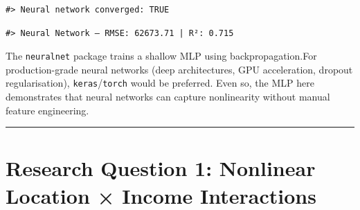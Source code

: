 \documentclass[
]{article}
\newenvironment{Shaded}{\begin{snugshade}}{\end{snugshade}}
\newcommand{\DecValTok}[1]{\textcolor[rgb]{0.00,0.00,0.81}{#1}}
\newcommand{\FunctionTok}[1]{\textcolor[rgb]{0.13,0.29,0.53}{\textbf{#1}}}
\newcommand{\NormalTok}[1]{#1}
\newcommand{\OtherTok}[1]{\textcolor[rgb]{0.56,0.35,0.01}{#1}}
\newcommand{\SpecialCharTok}[1]{\textcolor[rgb]{0.81,0.36,0.00}{\textbf{#1}}}
\newcommand{\StringTok}[1]{\textcolor[rgb]{0.31,0.60,0.02}{#1}}
\begin{document}
\begin{verbatim}
#> Neural network converged: TRUE
\end{verbatim}

\begin{Shaded}
\end{Shaded}

\begin{verbatim}
#> Neural Network — RMSE: 62673.71 | R²: 0.715
\end{verbatim}

The \texttt{neuralnet} package trains a shallow MLP using
backpropagation.For production-grade neural networks (deep
architectures, GPU acceleration, dropout regularisation),
\texttt{keras}/\texttt{torch} would be preferred. Even so, the MLP here
demonstrates that neural networks can capture nonlinearity without
manual feature engineering.

\begin{center}\rule{0.5\linewidth}{0.5pt}\end{center}

\section{Research Question 1: Nonlinear Location × Income
Interactions}\label{research-question-1-nonlinear-location-income-interactions}
\end{document}
